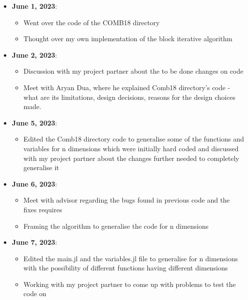 \documentclass[a4paper,11pt,fleqn]{article}
\theoremstyle{plain}{\theorembodyfont{\rmfamily}%
\newtheorem{conjecture}[theorem]{Conjecture}}
\theoremstyle{plain}{\theorembodyfont{\rmfamily}%
\newtheorem{example}[theorem]{Example}}
\theoremstyle{plain}{\theorembodyfont{\rmfamily}%
\newtheorem{remark}[theorem]{Remark}}
\theoremstyle{plain}{\theorembodyfont{\rmfamily}%
\newtheorem{algorithm}[theorem]{Algorithm}}
\theoremstyle{plain}{\theorembodyfont{\rmfamily}%
\newtheorem{condition}[theorem]{Condition}}
\theoremstyle{plain}{\theorembodyfont{\rmfamily}%
\newtheorem{definition}[theorem]{Definition}}
\theoremstyle{plain}{\theorembodyfont{\rmfamily}
\newtheorem{fact}[theorem]{Fact}}
\theoremstyle{plain}{\theorembodyfont{\rmfamily}
\newtheorem{problem}[theorem]{Problem}}
\theoremstyle{plain}{\theorembodyfont{\rmfamily}
\newtheorem{notation}[theorem]{Notation}}
\theoremstyle{plain}{\theorembodyfont{\rmfamily}
\newtheorem{project}[theorem]{Project}}
\begin{document}
\begin{itemize}
\item 
{\bf June 1, 2023}:
\begin{itemize} 
    \item Went over the code of the COMB18 directory
    \item Thought over my own implementation of the block iterative algorithm
\end{itemize}

\item {\bf June 2, 2023}:
\begin{itemize} 
\item Discussion with my project partner about the to be done changes on code
\item Meet with Aryan Dua, where he explained Comb18 directory's code - what are its limitations, design decisions, reasons for the design choices made.
\end{itemize}

\item {\bf June 5, 2023}:
\begin{itemize} 
\item Edited the Comb18 directory code to generalise some of the functions and variables for n dimensions which were initially hard coded and discussed with my project partner about the changes further needed to completely generalise it
\end{itemize}

\item {\bf June 6, 2023}:
\begin{itemize} 
\item Meet with advisor regarding the bugs found in previous code and the fixes requires
\item Framing the algorithm to generalise the code for n dimensions
\end{itemize}

\item {\bf June 7, 2023}:
\begin{itemize} 
\item Edited the main.jl and the variables.jl file to generalise for n dimensions with the possibility of different functions having different dimensions
\item Working with my project partner to come up with problems to test the code on
\end{itemize}



\end{itemize}
\end{document}

